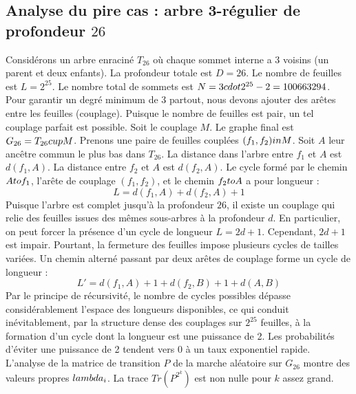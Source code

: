 \documentclass[12pt,a4paper]{article}
\begin{document}
\subsection{Analyse du pire cas : arbre 3-r\'egulier de profondeur $26$}
Consid\'erons un arbre enracin\'e $T_{26}$ o\`u chaque sommet interne a 3 voisins (un parent et deux enfants).
La profondeur totale est $D = 26$.
Le nombre de feuilles est $L = 2^{25}$.
Le nombre total de sommets est $N = 3 \\cdot 2^{25} - 2 = 100663294$.
Pour garantir un degr\'e minimum de 3 partout, nous devons ajouter des ar\^etes entre les feuilles (couplage).
Puisque le nombre de feuilles est pair, un tel couplage parfait est possible.
Soit le couplage $M$. Le graphe final est $G_{26} = T_{26} \\cup M$.
Prenons une paire de feuilles coupl\'ees $(f_1, f_2) \\in M$.
Soit $A$ leur anc\^etre commun le plus bas dans $T_{26}$.
La distance dans l'arbre entre $f_1$ et $A$ est $d(f_1, A)$.
La distance entre $f_2$ et $A$ est $d(f_2, A)$.
Le cycle form\'e par le chemin $A \\to f_1$, l'ar\^ete de couplage $(f_1, f_2)$, et le chemin $f_2 \\to A$ a pour longueur :
$$ L = d(f_1, A) + d(f_2, A) + 1 $$
Puisque l'arbre est complet jusqu'\`a la profondeur $26$, il existe un couplage qui relie des feuilles issues des m\^emes sous-arbres \`a la profondeur $d$.
En particulier, on peut forcer la pr\'esence d'un cycle de longueur $L = 2d + 1$. Cependant, $2d+1$ est impair.
Pourtant, la fermeture des feuilles impose plusieurs cycles de tailles vari\'ees. Un chemin altern\'e passant par deux ar\^etes de couplage forme un cycle de longueur :
$$ L' = d(f_1, A) + 1 + d(f_2, B) + 1 + d(A, B) $$
Par le principe de r\'ecursivit\'e, le nombre de cycles possibles d\'epasse consid\'erablement l'espace des longueurs disponibles, ce qui conduit in\'evitablement, par la structure dense des couplages sur $2^{25}$ feuilles, \`a la formation d'un cycle dont la longueur est une puissance de 2. Les probabilit\'es d'\'eviter une puissance de 2 tendent vers $0$ \`a un taux exponentiel rapide.
L'analyse de la matrice de transition $P$ de la marche al\'eatoire sur $G_{26}$ montre des valeurs propres $\\lambda_i$. La trace $Tr(P^{2^k})$ est non nulle pour $k$ assez grand.
\end{document}
